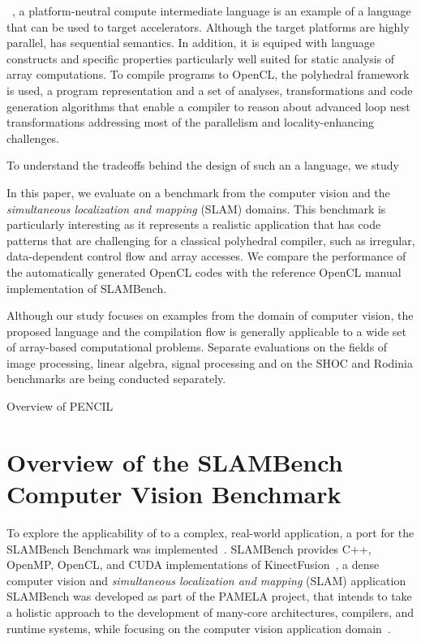 \documentclass{llncs}
\begin{document}
\pencil{}~\cite{pencil}, a platform-neutral compute intermediate
language is an example of a language that can be used to target
accelerators.
Although the target platforms are highly parallel, \pencil{} has
sequential semantics.  In addition, it is equiped with language
constructs and specific properties particularly well
suited for static analysis of array computations.
To compile \pencil{} programs to OpenCL, the polyhedral framework is used,
a program representation and a set of analyses, transformations and code
generation algorithms that enable a compiler to reason about advanced
loop nest transformations addressing most of the parallelism and
locality-enhancing challenges.

To understand the tradeoffs behind the design of such an a
language, we study 


In this paper, we evaluate \pencil{} on a benchmark from the computer
vision and the \textit{simultaneous localization and mapping} (SLAM)
domains.
This benchmark is particularly interesting as it represents a realistic
application that has code patterns that are challenging for a classical
polyhedral compiler, such as irregular, data-dependent control flow
and array accesses.
We compare the performance of the automatically generated OpenCL codes
with the reference OpenCL manual implementation of SLAMBench.

Although our study focuses on examples from the domain of computer
vision, the proposed language and the \pencil{} compilation flow
is generally applicable to a wide set of array-based computational
problems.
Separate evaluations on the fields of image processing, linear algebra,
signal processing and on the SHOC and Rodinia benchmarks are being
conducted separately.


Overview of PENCIL



\section{Overview of the SLAMBench Computer Vision Benchmark}

To explore the applicability of \pencil to a complex,
real-world application, a \pencil port for the SLAMBench
Benchmark was implemented~\cite{SLAMBench2015}.
SLAMBench provides C++, OpenMP, OpenCL, and CUDA implementations
of KinectFusion~\cite{KinectFusion2011}, a dense computer vision
and \textit{simultaneous localization and mapping} (SLAM)
application
SLAMBench was developed as part of the PAMELA project, that
intends to take a holistic approach to the development
of many-core architectures, compilers, and runtime systems,
while focusing on the computer vision application
domain~\cite{PAMELAWeb2012}.
\end{document}
